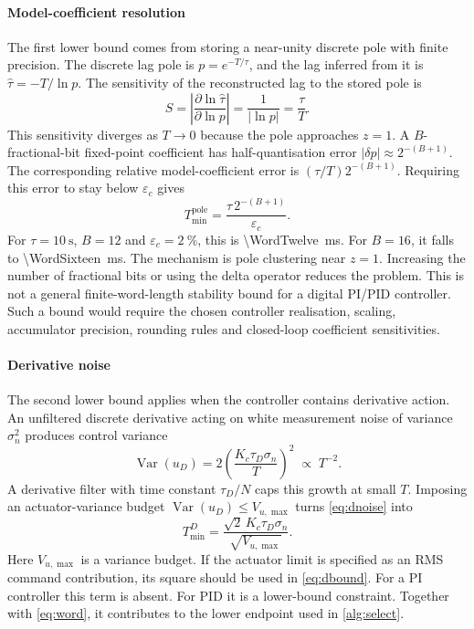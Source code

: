 \documentclass[a4paper,fleqn]{cas-sc}
\theoremstyle{remark}
\newcommand{\Tmin}{T_{\min}}
\begin{document}
\paragraph{Model-coefficient resolution} The first lower bound comes from
storing a near-unity discrete pole with finite precision. The discrete lag
pole is $p=e^{-T/\tau}$, and the lag inferred from it is
$\hat\tau=-T/\ln p$. The sensitivity of the reconstructed lag to the stored
pole is
\begin{equation}
S=\left|\frac{\partial\ln\hat\tau}{\partial\ln p}\right|
=\frac{1}{|\ln p|}=\frac{\tau}{T}.
\label{eq:sens}
\end{equation}
This sensitivity diverges as $T\to0$ because the pole approaches $z=1$. A
$B$-fractional-bit fixed-point coefficient has half-quantisation error
$|\delta p|\approx 2^{-(B+1)}$. The corresponding relative model-coefficient
error is $(\tau/T)2^{-(B+1)}$. Requiring this error to stay below
$\varepsilon_c$ gives
\begin{equation}
\Tmin^{\mathrm{pole}}=\frac{\tau\,2^{-(B+1)}}{\varepsilon_c}.
\label{eq:word}
\end{equation}
For $\tau=\SI{10}{\second}$, $B=12$ and $\varepsilon_c=\SI{2}{\percent}$, this
is \SI{\WordTwelve}{\milli\second}. For $B=16$, it falls to
\SI{\WordSixteen}{\milli\second}. The mechanism is pole clustering near $z=1$.
Increasing the number of fractional bits or using the delta operator reduces
the problem. This is not a general finite-word-length stability bound for a
digital PI/PID controller. Such a bound would require the chosen controller
realisation, scaling, accumulator precision, rounding rules and closed-loop
coefficient sensitivities.

\paragraph{Derivative noise} The second lower bound applies when the
controller contains derivative action. An unfiltered discrete derivative
acting on white measurement noise of variance $\sigma_n^2$ produces control
variance
\begin{equation}
\operatorname{Var}(u_D)=2\left(\frac{K_c\tau_D\sigma_n}{T}\right)^2
\;\propto\;T^{-2}.
\label{eq:dnoise}
\end{equation}
A derivative filter with time constant $\tau_D/N$ caps this growth at small
$T$. Imposing an actuator-variance budget
$\operatorname{Var}(u_D)\le V_{u,\max}$ turns \cref{eq:dnoise} into
\begin{equation}
\Tmin^{D}=\frac{\sqrt{2}\,K_c\tau_D\sigma_n}{\sqrt{V_{u,\max}}}.
\label{eq:dbound}
\end{equation}
Here $V_{u,\max}$ is a variance budget. If the actuator limit is specified as
an RMS command contribution, its square should be used in \cref{eq:dbound}.
For a PI controller this term is absent. For PID it is a lower-bound
constraint. Together with \cref{eq:word}, it contributes to the lower endpoint
used in \cref{alg:select}.
\end{document}
